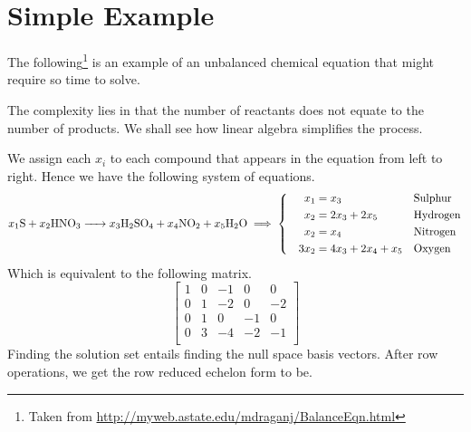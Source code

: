 \documentclass{article}
\begin{document}
	\section{Simple Example}
	The following\footnote{Taken from \url{http://myweb.astate.edu/mdraganj/BalanceEqn.html}} is an example of an unbalanced chemical equation that might require so time to solve.
	\begin{center}
	\end{center}
	The complexity lies in that the number of reactants does not equate to the number of products. We shall see how linear algebra simplifies the process.
	
	We assign each $x_i$ to each compound that appears in the equation from left to right. Hence we have the following system of equations.
	\begin{equation*}
	\ce{$x_1$S + $x_2$HNO3 -> $x_3$H2SO4 + $x_4$NO2 + $x_5$H2O} \implies
	\left\{
	\quad
	\begin{aligned}
	x_1  &= x_3 &&\text{Sulphur}\\
	x_2  &= 2x_3 + 2x_5 &&\text{Hydrogen}\\
	x_2  &= x_4 &&\text{Nitrogen}\\
	3x_2 &= 4x_3 + 2x_4 + x_5 &&\text{Oxygen} \\
	\end{aligned}
	\right.
	\end{equation*}
	Which is equivalent to the following matrix.
	\begin{equation*}
	\begin{bmatrix} 
	1 &  0 & -1 &  0 &  0 \\
	0 &  1 & -2 &  0 & -2 \\
	0 &  1 &  0 & -1 &  0 \\
	0 &  3 & -4 & -2 & -1 \\
	
	\end{bmatrix}
	\end{equation*}
	Finding the solution set entails finding the null space basis vectors. After row operations, we get the row reduced echelon form to be.
	
\end{document}
